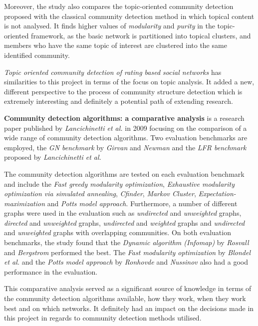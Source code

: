 Moreover, the study also compares the topic-oriented community detection proposed with the classical community detection method in which topical content is not analysed. It finds higher values of \textit{modularity} and \textit{purity} in the topic-oriented framework, as the basic network is partitioned into topical clusters, and members who have the same topic of interest are clustered into the same identified community.

\textit{Topic oriented community detection of rating based social networks} has similarities to this project in terms of the focus on topic analysis. It added a new, different perspective to the process of community structure detection which is extremely interesting and definitely a potential path of extending research.

\vspace*{1em}

\textbf{Community detection algorithms: a comparative analysis} is a research paper published by \textit{Lancichinetti et al.} \cite{lancichinetti2009community} in 2009 focusing on the comparison of a wide range of community detection algorithms. Two evaluation benchmarks are employed, the \textit{GN benchmark} by \textit{Girvan} and \textit{Newman} and the \textit{LFR benchmark} proposed by \textit{Lancichinetti et al.}

The community detection algorithms are tested on each evaluation benchmark and include the \textit{Fast greedy modularity optimization}, \textit{Exhaustive modularity optimization via simulated annealing}, \textit{Cfinder},  \textit{Markov Cluster}, \textit{Expectation-maximization} and \textit{Potts model approach}. Furthermore, a number of different graphs were used in the evaluation such as \textit{undirected} and \textit{unweighted} graphs, \textit{directed} and \textit{unweighted} graphs, \textit{undirected} and \textit{weighted} graphs and \textit{undirected} and \textit{unweighted} graphs with overlapping communities. On both evaluation benchmarks, the study found that the \textit{Dynamic algorithm (Infomap)} by \textit{Rosvall} and \textit{Bergstrom} performed the best. The \textit{Fast modularity optimization} by \textit{Blondel et al.} and the \textit{Potts model approach} by \textit{Ronhovde} and \textit{Nussinov} also had a good performance in the evaluation.

This comparative analysis served as a significant source of knowledge in terms of the community detection algorithms available, how they work, when they work best and on which networks. It definitely had an impact on the decisions made in this project in regards to community detection methods utilised. 


